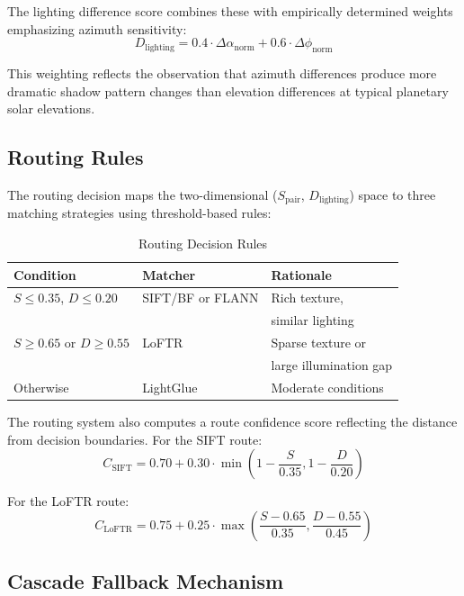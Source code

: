 \documentclass[lettersize,journal]{IEEEtran}
\begin{document}
The lighting difference score combines these with empirically determined weights emphasizing azimuth sensitivity:
\begin{equation}
D_{\text{lighting}} = 0.4 \cdot \Delta\alpha_{\text{norm}} + 0.6 \cdot \Delta\phi_{\text{norm}}
\end{equation}

This weighting reflects the observation that azimuth differences produce more dramatic shadow pattern changes than elevation differences at typical planetary solar elevations.

\subsection{Routing Rules}

The routing decision maps the two-dimensional ($S_{\text{pair}}$, $D_{\text{lighting}}$) space to three matching strategies using threshold-based rules:

\begin{table}[htbp]
\caption{Routing Decision Rules}
\label{tab:routing_rules}
\centering
\begin{tabular}{@{}lll@{}}
\toprule
\textbf{Condition} & \textbf{Matcher} & \textbf{Rationale} \\
\midrule
$S \leq 0.35$, $D \leq 0.20$ & SIFT/BF or FLANN & Rich texture, \\
 &  & similar lighting \\
$S \geq 0.65$ or $D \geq 0.55$ & LoFTR & Sparse texture or \\
 &  & large illumination gap \\
Otherwise & LightGlue & Moderate conditions \\
\bottomrule
\end{tabular}
\end{table}

The routing system also computes a route confidence score reflecting the distance from decision boundaries. For the SIFT route:
\begin{equation}
C_{\text{SIFT}} = 0.70 + 0.30 \cdot \min\left(1 - \frac{S}{0.35}, 1 - \frac{D}{0.20}\right)
\end{equation}

For the LoFTR route:
\begin{equation}
C_{\text{LoFTR}} = 0.75 + 0.25 \cdot \max\left(\frac{S - 0.65}{0.35}, \frac{D - 0.55}{0.45}\right)
\end{equation}

\subsection{Cascade Fallback Mechanism}
\end{document}
